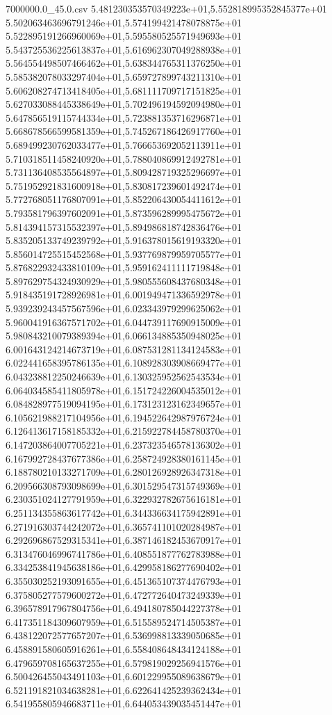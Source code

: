 \begin{filecontents*}{7000000.0_45.0.csv}
5.481230353570349223e+01,5.552818995352845377e+01
5.502063463696791246e+01,5.574199421478078875e+01
5.522895191266960069e+01,5.595580525571949693e+01
5.543725536225613837e+01,5.616962307049288938e+01
5.564554498507466462e+01,5.638344765311376250e+01
5.585382078033297404e+01,5.659727899743211310e+01
5.606208274713418405e+01,5.681111709717151825e+01
5.627033088445338649e+01,5.702496194592094980e+01
5.647856519115744334e+01,5.723881353716296871e+01
5.668678566599581359e+01,5.745267186426917760e+01
5.689499230762033477e+01,5.766653692052113911e+01
5.710318511458240920e+01,5.788040869912492781e+01
5.731136408535564897e+01,5.809428719325296697e+01
5.751952921831600918e+01,5.830817239601492474e+01
5.772768051176807091e+01,5.852206430054411612e+01
5.793581796397602091e+01,5.873596289995475672e+01
5.814394157315532397e+01,5.894986818742836476e+01
5.835205133749239792e+01,5.916378015619193320e+01
5.856014725515452568e+01,5.937769879959705577e+01
5.876822932433810109e+01,5.959162411111719848e+01
5.897629754324930929e+01,5.980555608437680348e+01
5.918435191728926981e+01,6.001949471336592978e+01
5.939239243457567596e+01,6.023343979299625062e+01
5.960041916367571702e+01,6.044739117690915009e+01
5.980843210079389394e+01,6.066134885350948025e+01
6.001643124214673719e+01,6.087531281134124583e+01
6.022441658395786135e+01,6.108928303908669477e+01
6.043238812250246639e+01,6.130325952562543534e+01
6.064034585411805978e+01,6.151724226004535012e+01
6.084828977519094195e+01,6.173123123162349657e+01
6.105621988217104956e+01,6.194522642987976724e+01
6.126413617158185332e+01,6.215922784458780370e+01
6.147203864007705221e+01,6.237323546578136302e+01
6.167992728437677386e+01,6.258724928380161145e+01
6.188780210133271709e+01,6.280126928926347318e+01
6.209566308793098699e+01,6.301529547315749369e+01
6.230351024127791959e+01,6.322932782675616181e+01
6.251134355863617742e+01,6.344336634175942891e+01
6.271916303744242072e+01,6.365741101020284987e+01
6.292696867529315341e+01,6.387146182453670917e+01
6.313476046996741786e+01,6.408551877762783988e+01
6.334253841945638186e+01,6.429958186277690402e+01
6.355030252193091655e+01,6.451365107374476793e+01
6.375805277579600272e+01,6.472772640473249339e+01
6.396578917967804756e+01,6.494180785044227378e+01
6.417351184309607959e+01,6.515589524714505387e+01
6.438122072577657207e+01,6.536998813339050685e+01
6.458891580605916261e+01,6.558408648434124188e+01
6.479659708165637255e+01,6.579819029256941576e+01
6.500426455043491103e+01,6.601229955089638679e+01
6.521191821034638281e+01,6.622641425239362434e+01
6.541955805946683711e+01,6.644053439035451447e+01

\end{filecontents*}
